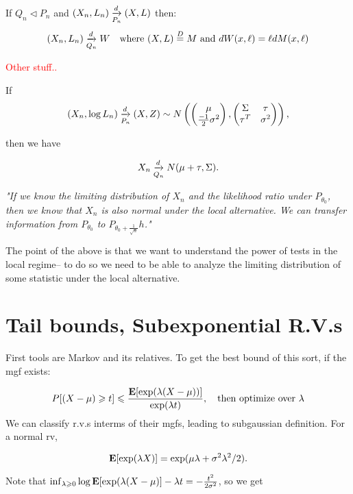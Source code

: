 \documentclass{article}
\newcommand\myworries[1]{\textcolor{red}{#1}}
\begin{document}
\begin{theorem}
If $Q_n \triangleleft P_n$ and $(X_n, L_n) \underset{P_n}{\xrightarrow{d}} (X,L)$ then:
$$(X_n, L_n)\underset{Q_n}{\xrightarrow{d}} W \quad \text{where } (X,L)\overset{D}{=}M \text{ and } dW(x,\ell) = \ell dM(x,\ell)$$

\myworries{Other stuff..}
\end{theorem}

\begin{theorem}
If 
$$(X_n, \log L_n) \underset{P_n}{\xrightarrow{d}} (X,Z) \sim N\left(\begin{pmatrix}
	\mu\\
	\frac{-1}{2} \sigma^2
\end{pmatrix},
\begin{pmatrix}
	\Sigma & \tau \\
	\tau^T & \sigma^2
\end{pmatrix}\right),$$

then we have 

$$X_n \underset{Q_n}{\xrightarrow{d}} N(\mu + \tau, \Sigma).$$


\textit{"If we know the limiting distribution of $X_n$ and the likelihood ratio under $P_{\theta_0}$, then we know that $X_n$ is also normal under the local alternative. We can transfer information from $P_{\theta_0}$ to $P_{\theta_0 + \frac{1}{\sqrt{n}}} h$."}
\end{theorem}

The point of the above is that we want to understand the power of tests in the local regime-- to do so we need to be able to analyze the limiting distribution of some statistic under the local alternative. 

\section{Tail bounds, Subexponential R.V.s}
First tools are Markov and its relatives. To get the best bound of this sort, if the mgf exists:

$$P[(X-\mu)\geqslant t] \leqslant \frac{\mathbf{E} [\exp(\lambda(X-\mu))]}{\exp(\lambda t)}, \quad \text{then optimize over } \lambda$$
We can classify r.v.s interms of their mgfs, leading to subgaussian definition. For a normal rv, 

$$\mathbf{E}[\exp(\lambda X)] = \exp(\mu\lambda + \sigma^2 \lambda^2/ 2).$$

Note that $\inf_{\lambda\geqslant 0} \log \mathbf{E} [\exp(\lambda (X-\mu)] - \lambda t = -\frac{t^2}{2\sigma^2}$, so we get 
\end{document}

